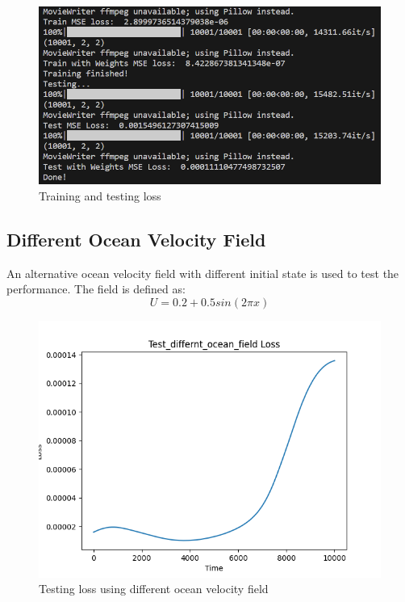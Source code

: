 \documentclass[12pt, a4paper]{article}
\begin{document}
\begin{figure}
    \centering
    \includegraphics[scale=0.7]{../mse.png}
    \caption[]{Training and testing loss}
    \label{fig:mse1}
\end{figure}

\subsection*{Different Ocean Velocity Field}
An alternative ocean velocity field with different initial state is used to test the performance. The field is defined as:
$$ U = 0.2 + 0.5sin(2 \pi x) $$

\begin{figure}
    \centering
    \includegraphics[scale=0.7]{../Test_differnt_ocean_field_loss.png}
    \caption[]{Testing loss using different ocean velocity field}
    \label{fig:loss_different_ovf}
\end{figure}
\end{document}
